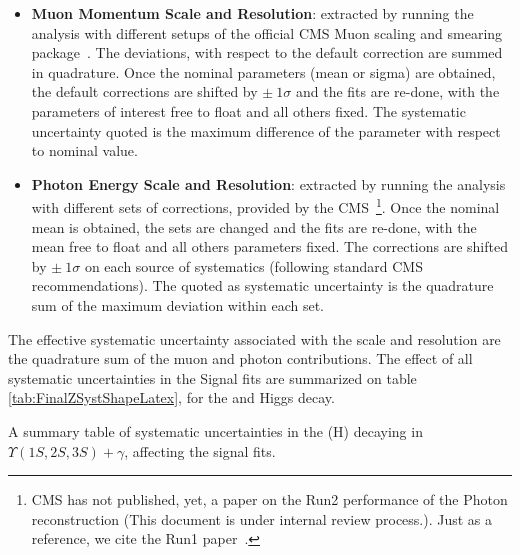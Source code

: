 \begin{itemize}

\item \textbf{Muon Momentum Scale and Resolution}: extracted by running the analysis with different setups of the official CMS Muon scaling and smearing package~\cite{cms_muon_performance}. The deviations, with respect to the default correction are summed in quadrature. Once the nominal parameters (mean or sigma) are obtained, the default corrections are shifted by $\pm~1\sigma$ and the fits are re-done, with the parameters of interest free to float and all others fixed. The systematic uncertainty quoted is the maximum difference of the parameter with respect to nominal value.

\item \textbf{Photon Energy Scale and Resolution}: extracted by running the analysis with different sets of corrections, provided by the CMS~\footnote{CMS has not published, yet, a paper on the Run2 performance of the Photon reconstruction (This document is under internal review process.). Just as a reference, we cite the Run1 paper~\cite{egamma_run1_papper}.}. Once the nominal mean is obtained, the sets are changed and the fits are re-done, with the mean free to float and all others parameters fixed. The corrections are shifted by $\pm~1\sigma$ on each source of systematics (following standard CMS recommendations). The quoted as systematic uncertainty is the quadrature sum of the maximum deviation within each set.



\end{itemize}

The effective systematic uncertainty associated with the scale and resolution are the quadrature sum of the muon and photon contributions. The effect of all systematic uncertainties in the Signal fits are summarized on table \ref{tab:FinalZSystShapeLatex}, for the \Z and Higgs decay. 

\begin{table}[ht]
\begin{center}

\caption{A summary table of systematic uncertainties in the \Z(H) decaying in $ \Upsilon(1S,2S,3S) + \gamma$, affecting the signal fits.}
\label{tab:FinalZSystShapeLatex}
\end{center}
\end{table}

%



